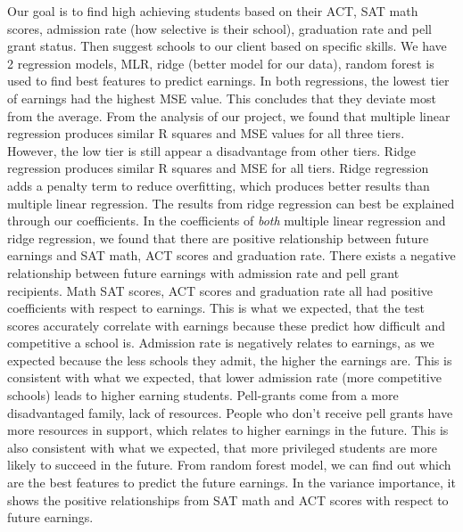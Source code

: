 \documentclass{article}
\begin{document}
Our goal is to find high achieving students based on their ACT, SAT math scores, admission rate (how selective is their school), graduation rate and pell grant status.  Then suggest schools to our client based on specific skills.
\newline
\indent  We have 2 regression models, MLR, ridge (better model for our data), random forest is used to find best features to predict earnings.  
In both regressions, the lowest tier of earnings had the highest MSE value.  This concludes that they deviate most from the average.  
\newline
\indent From the analysis of our project, we found that multiple linear regression produces similar R squares and MSE values for all three tiers.  However, the low tier is still appear a disadvantage from other tiers.  
\indent Ridge regression produces similar R squares and MSE for all tiers.  Ridge regression adds a penalty term to reduce overfitting, which produces better results than multiple linear regression.  
\newline
\indent The results from ridge regression can best be explained through our coefficients.  
In the coefficients of \emph{both} multiple linear regression and ridge regression, we found that there are positive relationship between future earnings and SAT math, ACT scores and graduation rate. There exists a negative relationship between future earnings with admission rate and pell grant recipients.  
\newline
\indent Math SAT scores, ACT scores and graduation rate all had positive coefficients with respect to earnings.  This is what we expected, that the test scores accurately correlate with earnings because these predict how difficult and competitive a school is.  
Admission rate is negatively relates to earnings, as we expected because the less schools they admit, the higher the earnings are.  This is consistent with what we expected, that lower admission rate (more competitive schools) leads to higher earning students.  
Pell-grants come from a more disadvantaged family, lack of resources.  People who don't receive pell grants have more resources in support, which relates to higher earnings in the future.  This is also consistent with what we expected, that more privileged students are more likely to succeed in the future.
\newline
\indent  From random forest model, we can find out which are the best features to predict the future earnings. In the variance importance, it shows the positive relationships from SAT math and ACT  scores with respect to future earnings.  	 		
\end{document}
